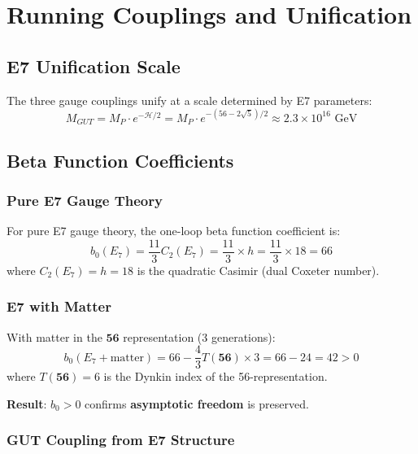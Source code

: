 \documentclass[11pt,a4paper]{article}
\begin{document}
\section{Running Couplings and Unification}
\label{sec:running}

\subsection{E7 Unification Scale}

The three gauge couplings unify at a scale determined by E7 parameters:
\begin{equation}
M_{GUT} = M_P \cdot e^{-\mathcal{H}/2} = M_P \cdot e^{-(56-2\sqrt{5})/2} \approx 2.3 \times 10^{16} \text{ GeV}
\end{equation}

\subsection{Beta Function Coefficients}

\subsubsection{Pure E7 Gauge Theory}

For pure E7 gauge theory, the one-loop beta function coefficient is:
\begin{equation}
b_0(E_7) = \frac{11}{3} C_2(E_7) = \frac{11}{3} \times h = \frac{11}{3} \times 18 = 66
\end{equation}
where $C_2(E_7) = h = 18$ is the quadratic Casimir (dual Coxeter number).

\subsubsection{E7 with Matter}

With matter in the $\mathbf{56}$ representation (3 generations):
\begin{equation}
b_0(E_7 + \text{matter}) = 66 - \frac{4}{3} T(\mathbf{56}) \times 3 = 66 - 24 = 42 > 0
\end{equation}
where $T(\mathbf{56}) = 6$ is the Dynkin index of the 56-representation.

\textbf{Result}: $b_0 > 0$ confirms \textbf{asymptotic freedom} is preserved.

\subsubsection{GUT Coupling from E7 Structure}
\end{document}
